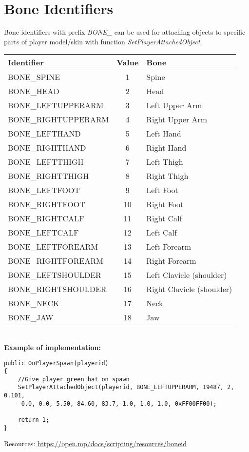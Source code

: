 \documentclass{article}
\begin{document}
\section{Bone Identifiers}
\begin{sloppypar}
Bone identifiers with prefix \textit{BONE\_} can be used for attaching objects to specific parts of player model/skin with function \textit{SetPlayerAttachedObject}.
\end{sloppypar}
\bigskip
\noindent\begin{tabular}{ |l|c|l| } 
\hline
Identifier & Value & Bone \\
\hline
BONE\_SPINE & 1 & Spine \\
BONE\_HEAD & 2 & Head \\
BONE\_LEFTUPPERARM & 3 & Left Upper Arm \\
BONE\_RIGHTUPPERARM & 4 & Right Upper Arm \\
BONE\_LEFTHAND & 5 & Left Hand \\
BONE\_RIGHTHAND & 6 & Right Hand \\
BONE\_LEFTTHIGH & 7 & Left Thigh \\
BONE\_RIGHTTHIGH & 8 & Right Thigh \\
BONE\_LEFTFOOT & 9 & Left Foot \\
BONE\_RIGHTFOOT & 10 & Right Foot \\
BONE\_RIGHTCALF & 11 & Right Calf \\
BONE\_LEFTCALF & 12 & Left Calf \\
BONE\_LEFTFOREARM & 13 & Left Forearm \\
BONE\_RIGHTFOREARM & 14 & Right Forearm \\
BONE\_LEFTSHOULDER & 15 & Left Clavicle (shoulder) \\
BONE\_RIGHTSHOULDER & 16 & Right Clavicle (shoulder) \\
BONE\_NECK & 17 & Neck \\
BONE\_JAW & 18 & Jaw \\
\hline
\end{tabular}
\bigskip
\\\textbf{Example of implementation:}
\begin{verbatim}
public OnPlayerSpawn(playerid)
{
    //Give player green hat on spawn
    SetPlayerAttachedObject(playerid, BONE_LEFTUPPERARM, 19487, 2, 0.101, 
    -0.0, 0.0, 5.50, 84.60, 83.7, 1.0, 1.0, 1.0, 0xFF00FF00);

    return 1;
}
\end{verbatim}
\bigskip
Resources: \url{https://open.mp/docs/scripting/resources/boneid}
\end{document}
